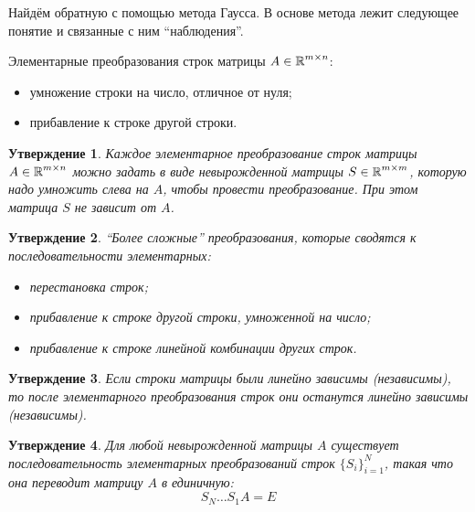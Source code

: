 \documentclass[a4paper,12pt]{article}
\newtheorem{proposition}{Утверждение}[section]
\theoremstyle{remark}
\begin{document}
  \begin{solution}
    Найдём обратную с помощью метода Гаусса.
    В основе метода лежит следующее понятие и связанные с ним ``наблюдения''.
    
    \begin{definition}
      Элементарные преобразования строк матрицы $A \in \operatorname{\mathbb R}^{m\times n}$:
      \begin{itemize}
        \item умножение строки на число, отличное от нуля;
        \item прибавление к строке другой строки.
      \end{itemize}
    \end{definition}
    
    \begin{proposition}
      Каждое элементарное преобразование строк матрицы $A \hm\in \RR^{m\times n}$ можно задать в виде невырожденной матрицы $S \hm\in \RR^{m \times m}$, которую надо умножить слева на $A$, чтобы провести преобразование.
      При этом матрица $S$ не зависит от $A$.
    \end{proposition}
    
    \begin{proposition}
      ``Более сложные'' преобразования, которые сводятся к последовательности элементарных:
      \begin{itemize}
        \item перестановка строк;
        \item прибавление к строке другой строки, умноженной на число;
        \item прибавление к строке линейной комбинации других строк.
      \end{itemize}
    \end{proposition}
    
    \begin{proposition}
      Если строки матрицы были линейно зависимы (независимы), то после элементарного преобразования строк они останутся линейно зависимы (независимы).
    \end{proposition}
    
    \begin{proposition}
      Для любой невырожденной матрицы $A$ существует последовательность элементарных преобразований строк $\{S_i\}_{i = 1}^N$, такая что она переводит матрицу $A$ в единичную:
      \[
        S_N \ldots S_1 A = E
      \]
    \end{proposition}
    

\end{solution}
\end{document}
